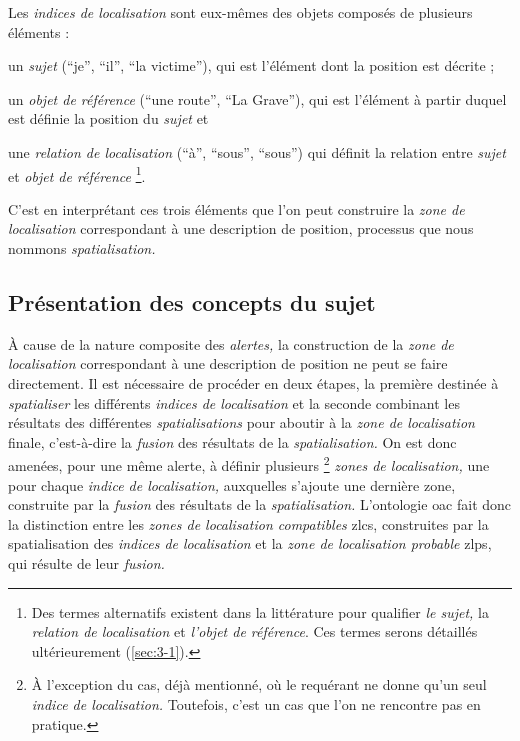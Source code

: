 Les \emph{indices de localisation} sont eux-mêmes des objets composés
de plusieurs éléments :
%
\begin{enumerate*}[label=(\alph*)]
\item un \emph{sujet} (\eg \enquote{je}, \enquote{il}, \enquote{la
    victime}), qui est l'élément dont la position est décrite ;
\item un \emph{objet de référence} (\eg \enquote{une route},
  \enquote{La Grave}), qui est l'élément à partir duquel est définie
  la position du \emph{sujet} et
\item une \emph{relation de localisation} (\eg \enquote{à},
  \enquote{sous}, \enquote{sous}) qui définit la relation entre
  \emph{sujet} et \emph{objet de référence} \footnote{Des termes
    alternatifs existent dans la littérature pour qualifier \emph{le
      sujet,} la \emph{relation de localisation} et \emph{l'objet de
      référence}. Ces termes serons détaillés ultérieurement
    (\ref{sec:3-1}).}.
\end{enumerate*}
%
C'est en interprétant ces trois éléments que l'on peut construire la
\emph{zone de localisation} correspondant à une description de
position, processus que nous nommons \emph{spatialisation.}

\subsection{Présentation des concepts du sujet}
\label{subsec:2-2}



À cause de la nature composite des \emph{alertes,} la construction de
la \emph{zone de localisation} correspondant à une description de
position ne peut se faire directement. Il est nécessaire de procéder
en deux étapes, la première destinée à \emph{spatialiser} les
différents \emph{indices de localisation} et la seconde combinant les
résultats des différentes \emph{spatialisations} pour aboutir à la
\emph{zone de localisation} finale, c'est-à-dire la \emph{fusion} des
résultats de la \emph{spatialisation.} On est donc amenées, pour une
même alerte, à définir plusieurs \footnote{À l'exception du cas, déjà
  mentionné, où le requérant ne donne qu'un seul \emph{indice de
    localisation.}  Toutefois, c'est un cas que l'on ne rencontre pas
  en pratique.}  \emph{zones de localisation,} une pour chaque
\emph{indice de localisation,} auxquelles s'ajoute une dernière zone,
construite par la \emph{fusion} des résultats de la
\emph{spatialisation.}  L'ontologie \ac{oac} \autocite{Viry2019} fait
donc la distinction entre les \emph{zones de localisation compatibles}
\acp{zlc}, construites par la spatialisation des \emph{indices de
  localisation} et la \emph{zone de localisation probable} \acp{zlp},
qui résulte de leur \emph{fusion.}

